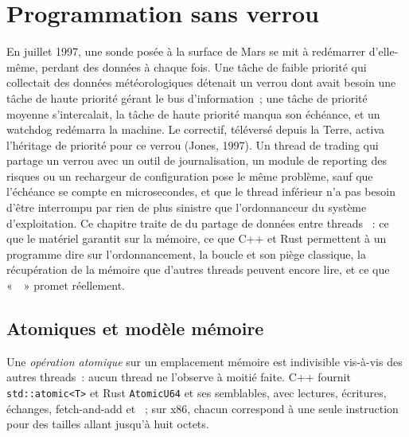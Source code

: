 \chapter{Programmation sans verrou}\label{ch:ll:lock-free-programming}

En juillet 1997, une sonde posée à la surface de Mars se mit à redémarrer d'elle-même, perdant des données à chaque fois. Une tâche de faible priorité qui
collectait des données météorologiques détenait un verrou dont avait besoin une tâche de haute priorité gérant le bus d'information~; une tâche de priorité moyenne
s'intercalait, la tâche de haute priorité manqua son échéance, et un watchdog redémarra la machine. Le correctif, téléversé depuis
la Terre, activa l'héritage de priorité pour ce verrou (Jones, 1997). Un thread de trading qui partage un verrou avec un outil de journalisation,
un module de reporting des risques ou un rechargeur de configuration pose le même problème, sauf que l'échéance se compte en microsecondes, et que le
thread inférieur n'a pas besoin d'être interrompu par rien de plus sinistre que l'ordonnanceur du système d'exploitation. Ce chapitre traite de
du partage de données entre threads ~: ce que le matériel garantit sur la mémoire, ce que C++ et Rust permettent à un programme
dire sur l'ordonnancement, la boucle  et son piège classique, la récupération de la mémoire que d'autres threads peuvent
encore lire, et ce que «~~» promet réellement.

\section{Atomiques et modèle mémoire}

\begin{definition}\label{def:ll:lock-free-programming:atomic}
Une \emph{opération atomique} sur un emplacement mémoire est indivisible vis-à-vis des autres threads~: aucun
thread ne l'observe à moitié faite. C++ fournit \texttt{std::atomic<T>} et Rust \texttt{AtomicU64} et ses semblables, avec
lectures, écritures, échanges, fetch-and-add et ~; sur x86, chacun correspond à une seule instruction pour des tailles allant jusqu'à huit
octets.
\end{definition}

